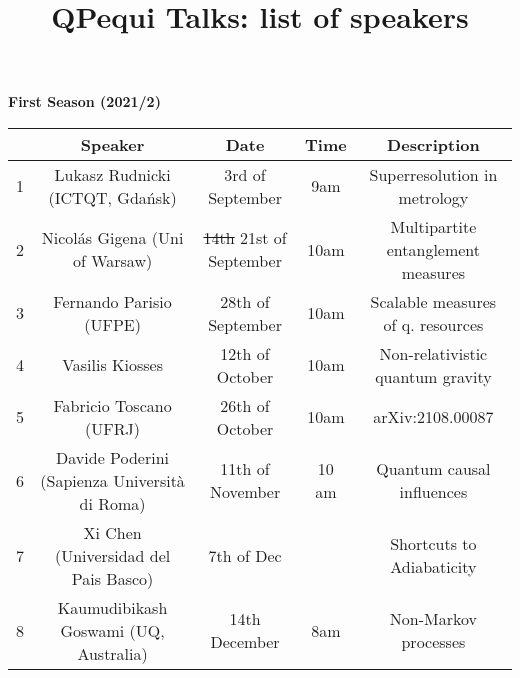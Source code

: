 \documentclass[a4paper,preprintnumbers,floatfix,superscriptaddress,pra,onecolumn,showpacs,notitlepage,longbibliography]{revtex4-1}
\begin{document}
\title{QPequi Talks: list of speakers}



\maketitle

\textbf{First Season (2021/2)}
\begin{center}
 \begin{tabular}{| c | c | c | c | c |} 
 \hline
 & Speaker & Date & Time & Description \\ [0.5ex] 
 \hline\hline
1 & Lukasz Rudnicki (ICTQT, Gda\' nsk) & 3rd of September & 9am & Superresolution in metrology  \\ 
 \hline
2 & Nicol\' as Gigena (Uni of Warsaw)
 & \st{14th} 21st of September & 10am & Multipartite entanglement measures\\
 \hline
3 & Fernando Parisio (UFPE) & 28th of September & 10am &  Scalable measures of q. resources  \\
 \hline
4 & Vasilis Kiosses & 12th of October  & 10am & Non-relativistic quantum gravity\\
 \hline
5 & Fabricio Toscano (UFRJ) & 26th of October & 10am & arXiv:2108.00087 \\  
 \hline
6 & Davide Poderini (Sapienza Università di Roma) & 11th of November & 10 am & 
Quantum causal influences\\  
 \hline
 7 & Xi Chen (Universidad del Pais Basco) & 7th of Dec & 
 & Shortcuts to Adiabaticity \\  
 \hline
 8 & Kaumudibikash Goswami (UQ, Australia) & 14th December & 8am & Non-Markov processes\\ 
 \hline

\end{tabular}
\end{center}
\end{document}
